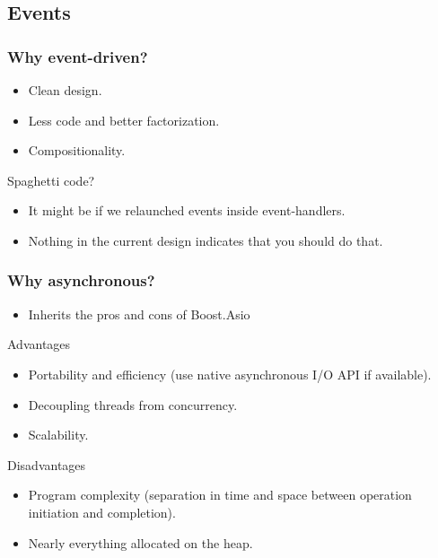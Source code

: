 \documentclass[xcolor=dvipsnames]{beamer}
\begin{document}
\subsection{Events}

\begin{frame}
\frametitle{Why event-driven?}

\begin{itemize}
  \item Clean design.
  \item Less code and better factorization.
  \item Compositionality.
\end{itemize}

\begin{block}{Spaghetti code?}
\begin{itemize}
  \item It might be if we relaunched events inside event-handlers.
  \item Nothing in the current design indicates that you should do that.
\end{itemize}
\end{block}
\end{frame}

\begin{frame}
\frametitle{Why asynchronous?}

\begin{itemize}
\item Inherits the pros and cons of Boost.Asio
\end{itemize}

\begin{exampleblock}{Advantages}
\begin{itemize}
  \item Portability and efficiency (use native asynchronous I/O API if available).
  \item Decoupling threads from concurrency.
  \item Scalability.
\end{itemize}
\end{exampleblock}

\begin{alertblock}{Disadvantages}
\begin{itemize}
  \item Program complexity (separation in time and space between operation initiation and completion).
  \item Nearly everything allocated on the heap.
\end{itemize}
\end{alertblock}

\end{frame}
\end{document}
